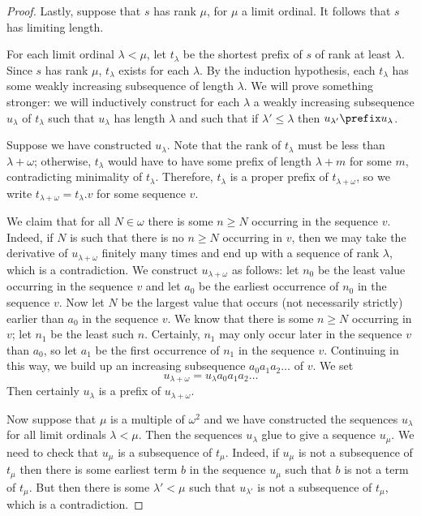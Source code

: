 \documentclass[11pt]{article} %
\begin{document}
\begin{theorem}
\begin{proof}
    Lastly, suppose that $s$ has rank $\mu$, for $\mu$ a limit ordinal.  It follows that $s$ has limiting length.  

    For each limit ordinal $\lambda<\mu$, let $t_\lambda$ be the shortest prefix of $s$ of rank at least $\lambda$.  Since $s$ has rank $\mu$, $t_\lambda$ exists for each $\lambda$.  By the induction hypothesis, each $t_\lambda$ has some weakly increasing subsequence of length $\lambda$.  We will prove something stronger: we will inductively construct for each $\lambda$ a weakly increasing subsequence $u_\lambda$ of $t_\lambda$ such that $u_\lambda$ has length $\lambda$ and such that if $\lambda'\le\lambda$ then $u_{\lambda'}\prefix u_\lambda$.  

    Suppose we have constructed $u_\lambda$.  Note that the rank of $t_\lambda$ must be less than $\lambda+\omega$; otherwise, $t_\lambda$ would have to have some prefix of length $\lambda+m$ for some $m$, contradicting minimality of $t_\lambda$.  Therefore, $t_\lambda$ is a proper prefix of $t_{\lambda+\omega}$, so we write $t_{\lambda+\omega}=t_\lambda.v$ for some sequence $v$.  

    We claim that for all $N\in\omega$ there is some $n\ge N$ occurring in the sequence $v$.  Indeed, if $N$ is such that there is no $n\ge N$ occurring in $v$, then we may take the derivative of $u_{\lambda+\omega}$ finitely many times and end up with a sequence of rank $\lambda$, which is a contradiction.  We construct $u_{\lambda+\omega}$ as follows: let $n_0$ be the least value occurring in the sequence $v$ and let $a_0$ be the earliest occurrence of $n_0$ in the sequence $v$.  Now let $N$ be the largest value that occurs (not necessarily strictly) earlier than $a_0$ in the sequence $v$.  We know that there is some $n\ge N$ occurring in $v$; let $n_1$ be the least such $n$.  Certainly, $n_1$ may only occur later in the sequence $v$ than $a_0$, so let $a_1$ be the first occurrence of $n_1$ in the sequence $v$.  Continuing in this way, we build up an increasing subsequence $a_0 a_1 a_2 \dots$ of $v$.  We set
    \[
      u_{\lambda+\omega} = u_\lambda a_0 a_1 a_2 \dots
      \]
    Then certainly $u_\lambda$ is a prefix of $u_{\lambda+\omega}$.  

    Now suppose that $\mu$ is a multiple of $\omega^2$ and we have constructed the sequences $u_\lambda$ for all limit ordinals $\lambda<\mu$.  Then the sequences $u_\lambda$ glue to give a sequence $u_\mu$.  We need to check that $u_\mu$ is a subsequence of $t_\mu$.  Indeed, if $u_\mu$ is not a subsequence of $t_\mu$ then there is some earliest term $b$ in the sequence $u_\mu$ such that $b$ is not a term of $t_\mu$.  But then there is some $\lambda'<\mu$ such that $u_{\lambda'}$ is not a subsequence of $t_\mu$, which is a contradiction.  


\end{proof}
\end{theorem}
\end{document}
